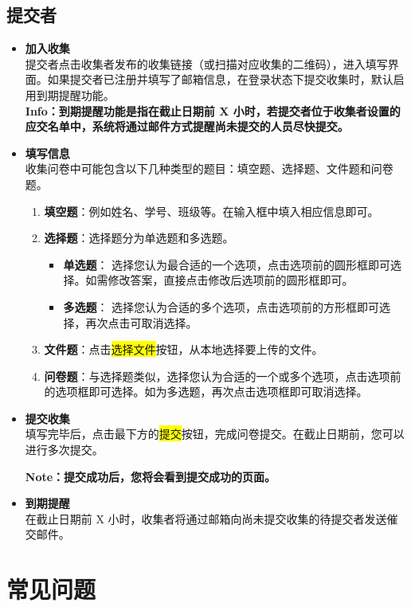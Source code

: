 \documentclass[lang=cn,11pt,a4paper]{elegantpaper}
\newcommand{\hlc}[2][yellow]{\colorbox{#1}{#2}} %
\begin{document}
\subsection{提交者}
\begin{itemize}
	\item \textbf{加入收集}\\
	提交者点击收集者发布的收集链接（或扫描对应收集的二维码），进入填写界面。如果提交者已注册并填写了邮箱信息，在登录状态下提交收集时，默认启用到期提醒功能。\\
	\textbf{Info：到期提醒功能是指在截止日期前 X 小时，若提交者位于收集者设置的应交名单中，系统将通过邮件方式提醒尚未提交的人员尽快提交。}
	\item \textbf{填写信息}\\
	收集问卷中可能包含以下几种类型的题目：填空题、选择题、文件题和问卷题。
	\begin{enumerate}
		\item \textbf{填空题}：例如姓名、学号、班级等。在输入框中填入相应信息即可。
		\item \textbf{选择题}：选择题分为单选题和多选题。
		\begin{itemize}
			\item \textbf{单选题}：
			选择您认为最合适的一个选项，点击选项前的圆形框即可选择。如需修改答案，直接点击修改后选项前的圆形框即可。
			\item \textbf{多选题}：
			选择您认为合适的多个选项，点击选项前的方形框即可选择，再次点击可取消选择。
		\end{itemize}
		\item \textbf{文件题}：点击\hlc{选择文件}按钮，从本地选择要上传的文件。
		\item \textbf{问卷题}：与选择题类似，选择您认为合适的一个或多个选项，点击选项前的选项框即可选择。如为多选题，再次点击选项框即可取消选择。
	\end{enumerate}
	\item \textbf{提交收集}\\
	填写完毕后，点击最下方的\hlc{提交}按钮，完成问卷提交。在截止日期前，您可以进行多次提交。
	
	\textbf{Note：提交成功后，您将会看到提交成功的页面。}
	
	\item \textbf{到期提醒}\\
	在截止日期前 X 小时，收集者将通过邮箱向尚未提交收集的待提交者发送催交邮件。
\end{itemize}
\clearpage
\section{常见问题}
\end{document}
